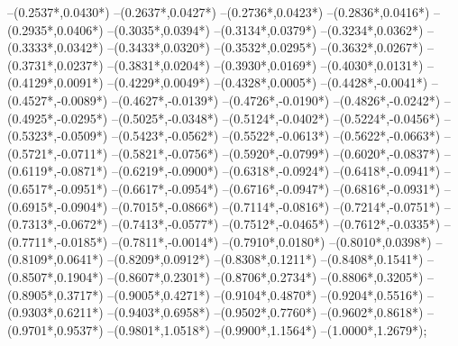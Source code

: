 {	--({0.2537*\xskala},{0.0430*\yskala})
	--({0.2637*\xskala},{0.0427*\yskala})
	--({0.2736*\xskala},{0.0423*\yskala})
	--({0.2836*\xskala},{0.0416*\yskala})
	--({0.2935*\xskala},{0.0406*\yskala})
	--({0.3035*\xskala},{0.0394*\yskala})
	--({0.3134*\xskala},{0.0379*\yskala})
	--({0.3234*\xskala},{0.0362*\yskala})
	--({0.3333*\xskala},{0.0342*\yskala})
	--({0.3433*\xskala},{0.0320*\yskala})
	--({0.3532*\xskala},{0.0295*\yskala})
	--({0.3632*\xskala},{0.0267*\yskala})
	--({0.3731*\xskala},{0.0237*\yskala})
	--({0.3831*\xskala},{0.0204*\yskala})
	--({0.3930*\xskala},{0.0169*\yskala})
	--({0.4030*\xskala},{0.0131*\yskala})
	--({0.4129*\xskala},{0.0091*\yskala})
	--({0.4229*\xskala},{0.0049*\yskala})
	--({0.4328*\xskala},{0.0005*\yskala})
	--({0.4428*\xskala},{-0.0041*\yskala})
	--({0.4527*\xskala},{-0.0089*\yskala})
	--({0.4627*\xskala},{-0.0139*\yskala})
	--({0.4726*\xskala},{-0.0190*\yskala})
	--({0.4826*\xskala},{-0.0242*\yskala})
	--({0.4925*\xskala},{-0.0295*\yskala})
	--({0.5025*\xskala},{-0.0348*\yskala})
	--({0.5124*\xskala},{-0.0402*\yskala})
	--({0.5224*\xskala},{-0.0456*\yskala})
	--({0.5323*\xskala},{-0.0509*\yskala})
	--({0.5423*\xskala},{-0.0562*\yskala})
	--({0.5522*\xskala},{-0.0613*\yskala})
	--({0.5622*\xskala},{-0.0663*\yskala})
	--({0.5721*\xskala},{-0.0711*\yskala})
	--({0.5821*\xskala},{-0.0756*\yskala})
	--({0.5920*\xskala},{-0.0799*\yskala})
	--({0.6020*\xskala},{-0.0837*\yskala})
	--({0.6119*\xskala},{-0.0871*\yskala})
	--({0.6219*\xskala},{-0.0900*\yskala})
	--({0.6318*\xskala},{-0.0924*\yskala})
	--({0.6418*\xskala},{-0.0941*\yskala})
	--({0.6517*\xskala},{-0.0951*\yskala})
	--({0.6617*\xskala},{-0.0954*\yskala})
	--({0.6716*\xskala},{-0.0947*\yskala})
	--({0.6816*\xskala},{-0.0931*\yskala})
	--({0.6915*\xskala},{-0.0904*\yskala})
	--({0.7015*\xskala},{-0.0866*\yskala})
	--({0.7114*\xskala},{-0.0816*\yskala})
	--({0.7214*\xskala},{-0.0751*\yskala})
	--({0.7313*\xskala},{-0.0672*\yskala})
	--({0.7413*\xskala},{-0.0577*\yskala})
	--({0.7512*\xskala},{-0.0465*\yskala})
	--({0.7612*\xskala},{-0.0335*\yskala})
	--({0.7711*\xskala},{-0.0185*\yskala})
	--({0.7811*\xskala},{-0.0014*\yskala})
	--({0.7910*\xskala},{0.0180*\yskala})
	--({0.8010*\xskala},{0.0398*\yskala})
	--({0.8109*\xskala},{0.0641*\yskala})
	--({0.8209*\xskala},{0.0912*\yskala})
	--({0.8308*\xskala},{0.1211*\yskala})
	--({0.8408*\xskala},{0.1541*\yskala})
	--({0.8507*\xskala},{0.1904*\yskala})
	--({0.8607*\xskala},{0.2301*\yskala})
	--({0.8706*\xskala},{0.2734*\yskala})
	--({0.8806*\xskala},{0.3205*\yskala})
	--({0.8905*\xskala},{0.3717*\yskala})
	--({0.9005*\xskala},{0.4271*\yskala})
	--({0.9104*\xskala},{0.4870*\yskala})
	--({0.9204*\xskala},{0.5516*\yskala})
	--({0.9303*\xskala},{0.6211*\yskala})
	--({0.9403*\xskala},{0.6958*\yskala})
	--({0.9502*\xskala},{0.7760*\yskala})
	--({0.9602*\xskala},{0.8618*\yskala})
	--({0.9701*\xskala},{0.9537*\yskala})
	--({0.9801*\xskala},{1.0518*\yskala})
	--({0.9900*\xskala},{1.1564*\yskala})
	--({1.0000*\xskala},{1.2679*\yskala});
}
\def\punktsix{
\fill[color=red] ({0.9749*\xskala},\yskala) circle[radius={0.08/\skala}];
;
}
